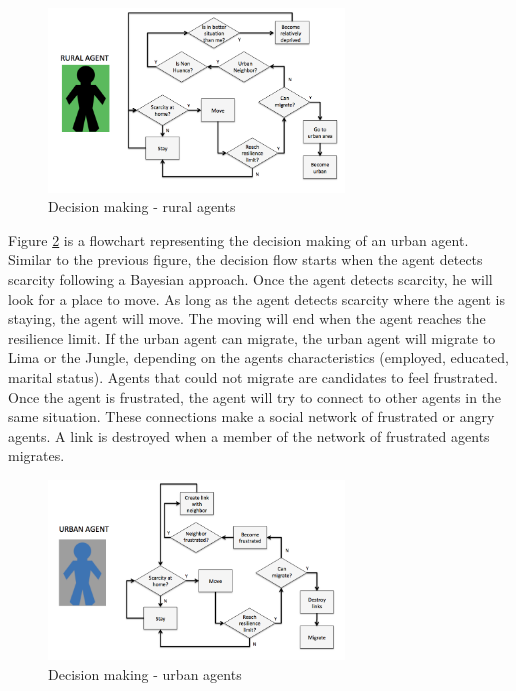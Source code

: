 \documentclass{article}
\begin{document}
\begin{figure}[ht]
\centering
  \includegraphics[width=0.7\textwidth]{ruralLogic}
  \caption[Decision making - rural agents]{Decision making - rural agents}
  \label{ruralLogic}
\end{figure}

Figure \ref{urbanLogic} is a flowchart representing the decision making of an urban agent. Similar to the previous figure, the decision flow starts when the agent detects scarcity following a Bayesian approach. Once the agent detects scarcity, he will look for a place to move. As long as the agent detects scarcity where the agent is staying, the agent will move. The moving will end when the agent reaches the resilience limit. If the urban agent can migrate, the urban agent will migrate to Lima or the Jungle, depending on the agent\textquotesingle s characteristics (employed, educated, marital status). Agents that could not migrate are candidates to feel frustrated. Once the agent is frustrated, the agent will try to connect to other agents in the same situation. These connections make a social network of frustrated or angry agents. A link is destroyed when a member of the network of frustrated agents migrates.

\begin{figure}[ht]
\centering
  \includegraphics[width=0.7\textwidth]{urbanLogic}
  \caption[Decision making - urban agents]{Decision making - urban agents}
  \label{urbanLogic}
\end{figure}
\end{document}
